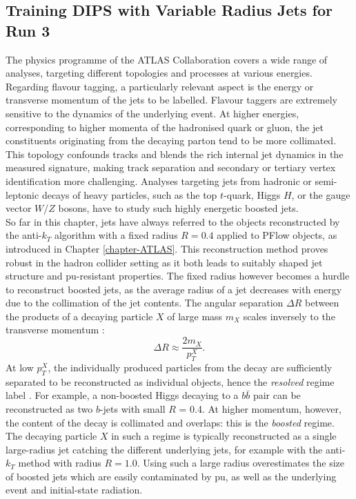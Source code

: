 \subsection{Training DIPS with Variable Radius Jets for Run 3}\label{chapter:dipsVRtrain}
The physics programme of the ATLAS Collaboration covers a wide range of analyses, targeting different topologies and processes at various energies. Regarding flavour tagging, a particularly relevant aspect is the energy or transverse momentum of the jets to be labelled. Flavour taggers are extremely sensitive to the dynamics of the underlying event. At higher energies, corresponding to higher momenta of the hadronised quark or gluon, the jet constituents originating from the decaying parton tend to be more collimated. This topology confounds tracks and blends the rich internal jet dynamics in the measured signature, making track separation and secondary or tertiary vertex identification more challenging. Analyses targeting jets from hadronic or semi-leptonic decays of heavy particles, such as the top $t$-quark, Higgs $H$, or the gauge vector $W$/$Z$ bosons, have to study such highly energetic boosted jets.  \\

So far in this chapter, jets have always referred to the objects reconstructed by the anti-$k_T$ algorithm with a fixed radius $R = 0.4$ applied to PFlow objects, as introduced in Chapter \ref{chapter-ATLAS}. This reconstruction method proves robust in the hadron collider setting as it both leads to suitably shaped jet structure and \gls{pu}-resistant properties. The fixed radius however becomes a hurdle to reconstruct boosted jets, as the average radius of a jet decreases with energy due to the collimation of the jet contents. The angular separation $\Delta R$ between the products of a decaying particle $X$ of large mass $m_X$ scales inversely to the transverse momentum \cite{ATLAS:largeRjet}: 
\begin{equation}\label{eq:sizeJet}
  \Delta R \approx \frac{2 m_X}{p_T^X}.
\end{equation}
At low $p_T^X$, the individually produced particles from the decay are sufficiently separated to be reconstructed as individual objects, hence the \textit{resolved} regime label \cite{ATLAS:2016hcf}. For example, a non-boosted Higgs decaying to a $b\bar{b}$ pair can be reconstructed as two $b$-jets with small $R$ = 0.4. At higher momentum, however, the content of the decay is collimated and overlaps: this is the \textit{boosted} regime. The decaying particle $X$ in such a regime is typically reconstructed as a single large-radius jet catching the different underlying jets, for example with the anti-$k_T$ method with radius $R = 1.0$. Using such a large radius overestimates the size of boosted jets which are easily contaminated by \gls{pu}, as well as the underlying event and initial-state radiation.  \\

